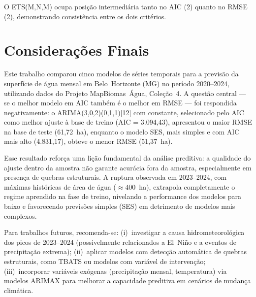 \documentclass[12pt, a4paper]{article}
\begin{document}
O ETS(M,N,M) ocupa posição intermediária tanto no AIC (2\textordmasculine)
quanto no RMSE (2\textordmasculine), demonstrando consistência entre os dois
critérios.

\section{Considerações Finais}

Este trabalho comparou cinco modelos de séries temporais para a previsão da
superfície de água mensal em Belo~Horizonte (MG) no período 2020--2024,
utilizando dados do Projeto MapBiomas~Água, Coleção~4. A questão central ---
se o melhor modelo em AIC também é o melhor em RMSE --- foi respondida
negativamente: o ARIMA(3,0,2)(0,1,1)[12] com constante, selecionado pelo AIC
como melhor ajuste à base de treino (AIC = 3.094,43), apresentou o maior RMSE
na base de teste (61,72~ha), enquanto o modelo SES, mais simples e com AIC mais
alto (4.831,17), obteve o menor RMSE (51,37~ha).

Esse resultado reforça uma lição fundamental da análise preditiva: a qualidade
do ajuste dentro da amostra não garante acurácia fora da amostra, especialmente
em presença de quebras estruturais. A ruptura observada em 2023--2024, com
máximas históricas de área de água ($\approx 400$~ha), extrapola completamente
o regime aprendido na fase de treino, nivelando a performance dos modelos para
baixo e favorecendo previsões simples (SES) em detrimento de modelos mais
complexos.

Para trabalhos futuros, recomenda-se: (i)~investigar a causa
hidrometeorológica dos picos de 2023--2024 (possivelmente relacionados a El~Niño
e a eventos de precipitação extrema); (ii)~aplicar modelos com detecção
automática de quebras estruturais, como TBATS ou modelos com variável de
intervenção; (iii)~incorporar variáveis exógenas (precipitação mensal,
temperatura) via modelos ARIMAX para melhorar a capacidade preditiva em
cenários de mudança climática.
\end{document}
